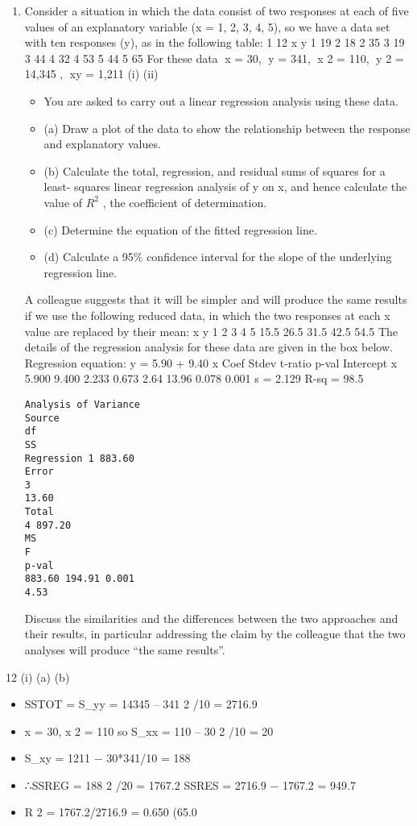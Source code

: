 \documentclass[a4paper,12pt]{article}
\begin{document}
\begin{enumerate}

\item Consider a situation in which the data consist of two responses at each of five values of an explanatory variable (x = 1, 2, 3, 4, 5), so we have a data set with ten responses (y), as in the following table:
1
12
x
y
1
19
2
18
2
35
3
19
3
44
4
32
4
53
5
44
5
65
For these data x = 30, y = 341, x 2 = 110, y 2 = 14,345 , xy = 1,211
(i)
(ii)
\begin{itemize}
\item You are asked to carry out a linear regression analysis using these data.
\item (a) Draw a plot of the data to show the relationship between the response and explanatory values.
\item (b) Calculate the total, regression, and residual sums of squares for a least- squares linear regression analysis of y on x, and hence calculate the value of $R^2$ , the coefficient of determination.
\item (c) Determine the equation of the fitted regression line.
\item (d) Calculate a 95\% confidence interval for the slope of the underlying regression line.
\end{itemize}
A colleague suggests that it will be simpler and will produce the same results if we use the following reduced data, in which the two responses at each x
value are replaced by their mean:
x
y
1
2
3
4
5
15.5 26.5 31.5 42.5 54.5
The details of the regression analysis for these data are given in the box below.
Regression equation: y = 5.90 + 9.40 x
Coef Stdev t-ratio p-val
Intercept
x 5.900
9.400 2.233
0.673 2.64
13.96 0.078
0.001
s = 2.129 R-sq = 98.5%
\begin{verbatim}
Analysis of Variance
Source
df
SS
Regression 1 883.60
Error
3
13.60
Total
4 897.20
MS
F
p-val
883.60 194.91 0.001
4.53
\end{verbatim}
Discuss the similarities and the differences between the two approaches and their
results, in particular addressing the claim by the colleague that the two analyses will
produce “the same results”.

\end{enumerate}
\newpage
12
(i)
(a)
(b)
\begin{itemize}
\item SSTOT = S_{yy} = 14345 – 341 2 /10 = 2716.9
\item \sum x = 30, \sum x 2 = 110 so S_{xx} = 110 – 30 2 /10 = 20
\item S_{xy} = 1211 − 30*341/10 = 188
\item ∴SSREG = 188 2 /20 = 1767.2
SSRES = 2716.9 − 1767.2 = 949.7
\item R 2 = 1767.2/2716.9 = 0.650 (65.0%
\end{itemize}
\end{document}
